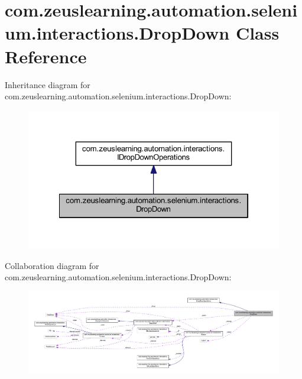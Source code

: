 \hypertarget{classcom_1_1zeuslearning_1_1automation_1_1selenium_1_1interactions_1_1DropDown}{}\section{com.\+zeuslearning.\+automation.\+selenium.\+interactions.\+Drop\+Down Class Reference}
\label{classcom_1_1zeuslearning_1_1automation_1_1selenium_1_1interactions_1_1DropDown}


Inheritance diagram for com.\+zeuslearning.\+automation.\+selenium.\+interactions.\+Drop\+Down\+:\nopagebreak
\begin{figure}[H]
\begin{center}
\leavevmode
\includegraphics[width=322pt]{db/d16/classcom_1_1zeuslearning_1_1automation_1_1selenium_1_1interactions_1_1DropDown__inherit__graph}
\end{center}
\end{figure}


Collaboration diagram for com.\+zeuslearning.\+automation.\+selenium.\+interactions.\+Drop\+Down\+:
\nopagebreak
\begin{figure}[H]
\begin{center}
\leavevmode
\includegraphics[width=350pt]{d8/dcb/classcom_1_1zeuslearning_1_1automation_1_1selenium_1_1interactions_1_1DropDown__coll__graph}
\end{center}
\end{figure}
